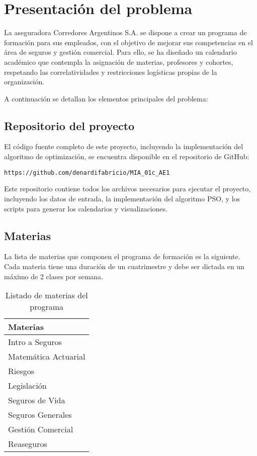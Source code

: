 \section{Presentación del problema}
La aseguradora Corredores Argentinos S.A. se dispone a crear un programa de formación para sus empleados, con el objetivo de mejorar sus competencias en el área de seguros y gestión comercial. Para ello, se ha diseñado un calendario académico que contempla la asignación de materias, profesores y cohortes, respetando las correlatividades y restricciones logísticas propias de la organización.

A continuación se detallan los elementos principales del problema:

\subsection*{Repositorio del proyecto}
El código fuente completo de este proyecto, incluyendo la implementación del algoritmo de optimización, se encuentra disponible en el repositorio de GitHub:

\texttt{https://github.com/denardifabricio/MIA\_01c\_AE1}

Este repositorio contiene todos los archivos necesarios para ejecutar el proyecto, incluyendo los datos de entrada, la implementación del algoritmo PSO, y los scripts para generar los calendarios y visualizaciones.

\subsection*{Materias}
La lista de materias que componen el programa de formación es la siguiente. Cada materia tiene una duración de un cuatrimestre y debe ser dictada en un máximo de 2 clases por semana.
\begin{table}[ht]
\centering
\begin{tabular}{|l|}
\hline
	\textbf{Materias} \\
\hline
Intro a Seguros \\
Matemática Actuarial \\
Riesgos \\
Legislación \\
Seguros de Vida \\
Seguros Generales \\
Gestión Comercial \\
Reaseguros \\
\hline
\end{tabular}
\caption{Listado de materias del programa}
\end{table}

